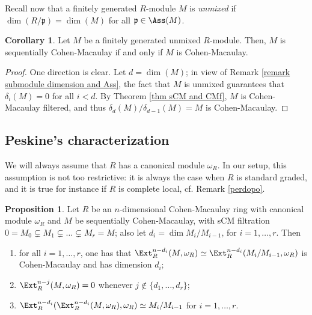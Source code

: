\documentclass[12pt]{amsart}
\theoremstyle{definition}
\newtheorem{corollary}[theorem]{Corollary}
\newtheorem{proposition}[theorem]{Proposition}
\theoremstyle{definition}
\def\frk{\mathfrak}               %
\def\pp{{\frk p}}
\begin{document}
Recall now that a finitely generated $R$-module $M$ is {\em unmixed} if $\dim(R/\pp) = \dim(M)$ for all $\pp \in \Ass(M)$.


\begin{corollary} Let $M$ be a finitely generated unmixed $R$-module. Then, $M$ is sequentially Cohen-Macaulay if and only if $M$ is Cohen-Macaulay.
\end{corollary}
\begin{proof}
One direction is clear. Let $d=\dim(M)$; in view of Remark \ref{remark submodule dimension and Ass}, the fact that $M$ is unmixed guarantees that $\delta_i(M) = 0$ for all $i<d$. By Theorem \ref{thm sCM and CMf}, $M$ is Cohen-Macaulay filtered, and thus $\delta_d(M)/\delta_{d-1}(M) = M$ is Cohen-Macaulay.
\end{proof}

\subsection{Peskine's characterization} 
We will always assume that $R$ has a canonical module $\omega_R$. In our setup, this assumption is not too restrictive: it is always the case when $R$ is standard graded, and it is true for instance if $R$ is complete local, cf. Remark \ref{perdopo}.
 

\begin{proposition}\label{fundaext}
 Let $R$ be an $n$-dimensional Cohen-Macaulay ring with canonical module $\omega_R$ and $M$ be sequentially Cohen-Macaulay, with sCM filtration $0=M_0\subsetneq M_1\subsetneq \ldots \subsetneq M_r=M$; also let $d_i=\dim M_i/M_{i-1}$, for $i=1,\ldots,r$. Then
\begin{enumerate}[(1)]
\item  for all $i=1,\ldots,r$, one has that $\Ext_R^{n-d_i}(M, \omega_R)\simeq \Ext_R^{n-d_i}(M_i/M_{i-1},\omega_R)$ is Cohen-Macaulay and has dimension $d_i$;
  \item $\Ext_R^{n-j}(M,\omega_R)=0$ whenever $j\not\in\{d_1,\ldots,d_r\}$;
\item $\Ext_R^{n-d_i}(\Ext_R^{n-d_i}(M,\omega_R),\omega_R)\simeq M_i/M_{i-1}$ for $i=1,\ldots,r$.
\end{enumerate}
\end{proposition}  
\end{document}
